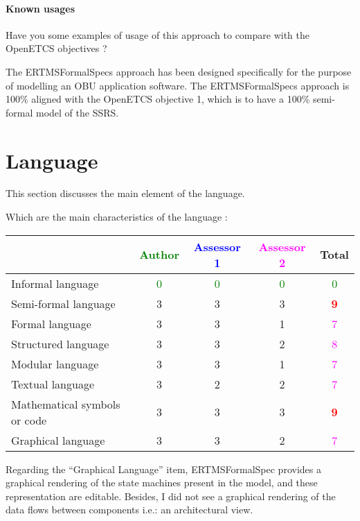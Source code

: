 \paragraph{Known usages} Have you some examples of usage of this approach to compare with the OpenETCS objectives ?

\begin{author_comment}
The ERTMSFormalSpecs approach has been designed specifically for the purpose of modelling an OBU application software. The ERTMSFormalSpecs approach is 100\% aligned with the OpenETCS objective 1, which is to have a 100\% semi-formal model of the SSRS. 
\end{author_comment}

\section{Language}
This section discusses the main element of the language.

Which are the main characteristics of the language :

\begin{tabular}{|l | c | c | c | c|}
\hline
& \textcolor{green}{Author} & \textcolor{blue}{Assessor 1} & \textcolor{magenta}{Assessor 2} & Total \\
\hline 
Informal language & \textcolor{green}{0} & \textcolor{green}{0} & \textcolor{green}{0} & \textcolor{green}{0} \\
\hline 
Semi-formal language & 3     & 3     & 3     & \textcolor{red}{\textbf{9}} \\
\hline
Formal language & 3     & 3     & 1     & \textcolor{magenta}{7} \\
\hline
Structured language & 3     & 3     & 2     & \textcolor{magenta}{8} \\
\hline 
Modular language & 3     & 3     & 1     & \textcolor{magenta}{7} \\
\hline
Textual language & 3     & 2     & 2     & \textcolor{magenta}{7} \\
\hline
Mathematical symbols or code & 3     & 3     & 3     & \textcolor{red}{\textbf{9}} \\
\hline
Graphical language & 3     & 3     & 2     & \textcolor{magenta}{7} \\
\hline
\end{tabular}

\begin{assessor1}
Regarding the "`Graphical Language"' item, ERTMSFormalSpec provides a graphical rendering of the state machines present in the model, and these representation are editable. Besides, I did not see a graphical rendering of the data flows between components i.e.: an architectural view. 
\end{assessor1}


